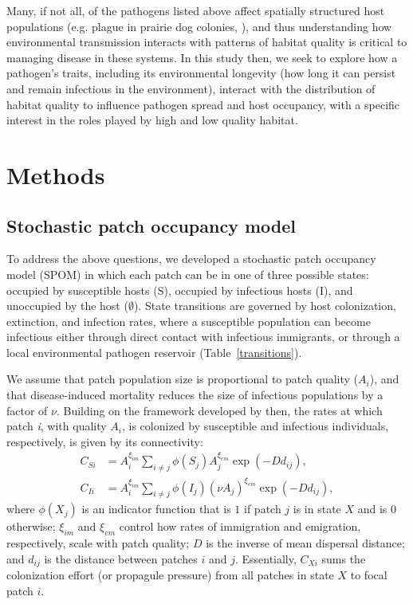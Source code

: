\documentclass{article}
\begin{document}
Many, if not all, of the pathogens listed above affect spatially structured host populations (e.g. plague in prairie dog colonies, \cite{George2013}), and thus understanding how environmental transmission interacts with patterns of habitat quality is critical to managing disease in these systems.  In this study then, we seek to explore how a pathogen's traits, including its environmental longevity (how long it can persist and remain infectious in the environment), interact with the distribution of habitat quality to influence pathogen spread and host occupancy, with a specific interest in the roles played by high and low quality habitat.  

\section{Methods}
\label{methods}

\subsection{Stochastic patch occupancy model}


To address the above questions, we developed a stochastic patch occupancy model (SPOM) in which each patch can be in one of three possible states: occupied by susceptible hosts (S), occupied by infectious hosts (I), and unoccupied by the host ($\emptyset$).  State transitions are governed by host colonization, extinction, and infection rates, where a susceptible population can become infectious either through direct contact with infectious immigrants, or through a local environmental pathogen reservoir (Table~\ref{transitions}).

We assume that patch population size is proportional to patch quality ($A_i$), and that disease-induced mortality reduces the size of infectious populations by a factor of $\nu$.  Building on the framework developed by \cite{Hanski2003} then, the rates at which patch \emph{i}, with quality $A_i$, is colonized by susceptible and infectious individuals, respectively, is given by its connectivity:
\begin{align}
C_{Si} &= A_i^{\xi_{im}} \sum_{i\neq j }\phi(S_j)A_j^{\xi_{em}}\exp(-D d_{ij}),\\
C_{Ii} &= A_i^{\xi_{im}} \sum_{i\neq j }\phi(I_j)(\nu A_j) ^{\xi_{em}}\exp(-D d_{ij}),
\label{connectivity}
\end{align}
where $\phi(X_j)$ is an indicator function that is $1$ if patch $j$ is in state $X$ and is $0$ otherwise; $\xi_{im}$ and $\xi_{em}$ control how rates of immigration and emigration, respectively, scale with patch quality; $D$ is the inverse of mean dispersal distance; and $d_{ij}$ is the distance between patches $i$ and $j$.  Essentially, $C_{Xi}$ sums the colonization effort (or propagule pressure) from all patches in state $X$ to focal patch $i$.  
\end{document}
